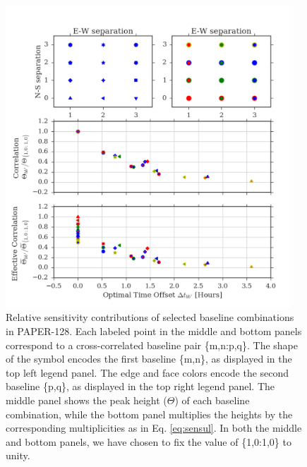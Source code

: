\documentclass[twocolumn,apj,numberedappendix]{emulateapj}
\renewcommand\[{\begin{equation}}
\renewcommand\]{\end{equation}}
\begin{document}
\begin{figure}[h!]
\includegraphics[width=0.95\textwidth]{sensitivity_1}

\caption{Relative sensitivity contributions of selected baseline combinations in PAPER-128. Each labeled point in the middle and bottom panels correspond to a cross-correlated baseline pair \{m,n:p,q\}. The shape of the symbol encodes the first baseline \{m,n\}, as displayed in the top left legend panel. The edge and face colors encode the second baseline \{p,q\}, as displayed in the top right legend panel. The middle
panel shows the peak height ($\Theta$) of each baseline
combination, while the bottom panel multiplies the heights by the
corresponding multiplicities as in Eq. \eqref{eq:sensul}. 
In both the middle and bottom panels, we have chosen to fix the value  of \{1,0:1,0\} to unity.  }
\label{fig:sensplot}
\end{figure}
\end{document}
